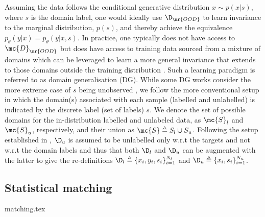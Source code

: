 Assuming the data follows the conditional generative distribution $x \sim p(x | s)$, where $s$ is
the domain label, one would ideally use $\D_{\mr{OOD}}$ to learn invariance to the marginal
distribution, $p(s)$, and thereby achieve the equivalence $p_\theta(y | x) = p_\theta(y | x, s)$.
%
In practice, one typically does not have access to $\mc{D}_{\mr{OOD}}$ but does have access to
training data sourced from a mixture of domains which can be leveraged to learn a more general
invariance that extends to those domains outside the training distribution
\cite{arjovsky2019invariant}.
%
Such a learning paradigm is referred to as domain generalisation (DG).
%
While some DG works consider the more extreme case of $s$ being unobserved
\citep{creager2021environment}, we follow the more conventional setup \citep{arjovsky2019invariant,
krueger2021out, SagWeiLeeGaoetal22} in which the domain(s) associated with each sample (labelled and
unlabelled) is indicated by the discrete label (set of labels) $s$. 
%
We denote the set of possible domains for the in-distribution labelled and unlabeled data, as
$\mc{S}_l$ and $\mc{S}_u$, respectively, and their union as $\mc{S} \triangleq S_l \cup S_u$.
Following the setup established in \cite{SagWeiLeeGaoetal22}, $\D_u$ is assumed to be unlabelled
only w.r.t the targets and not w.r.t the domain labels and thus that both $\D_l$ and $\D_u$ can be
augmented with the latter to give the re-definitions $\D_l \triangleq \{ x_i, y_i, s_i
\}_{i=1}^{N_l}$ and $\D_u \triangleq \{x_i, s_i \}_{i=1}^{N_u}$.

\subsection{Statistical matching} {matching.tex}
